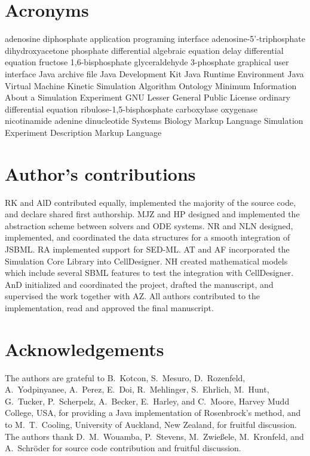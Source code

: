\documentclass[10pt]{bmc_article}
\newenvironment{bmcformat}{\begin{raggedright}\baselineskip20pt\sloppy\setboolean{publ}{false}}{\end{raggedright}\baselineskip20pt\sloppy}
\begin{document}
\begin{bmcformat}
\section*{Acronyms}
\begin{acronym}
         {adenosine diphosphate}
         {application programing interface}
         {adenosine-5'-triphosphate}
        {dihydroxyacetone phosphate}
         {differential algebraic equation}
         {delay differential equation}
      {fructose 1,6-bisphosphate}
        {glyceraldehyde 3-phosphate}
         {graphical user interface}
         {Java archive file}
         {Java Development Kit}
         {Java Runtime Environment}
         {Java Virtual Machine}
       {Kinetic Simulation Algorithm Ontology}
       {Minimum Information About a Simulation Experiment}
        {GNU Lesser General Public License}
         {ordinary differential equation}
     {ribulose-1,5-bisphosphate carboxylase oxygenase}
     {nicotinamide adenine dinucleotide}
        {Systems Biology Markup Language}
      {Simulation Experiment Description Markup Language}
\end{acronym}


\section*{Author's contributions}
RK and AlD contributed equally, implemented the majority of the source code, and
declare shared first authorship.
MJZ and HP designed and implemented the abstraction scheme between solvers and
\acs{ODE} systems.
NR and NLN designed, implemented, and coordinated the data structures for a
smooth integration of JSBML.
RA implemented support for \acs{SED-ML}.
AT and AF incorporated the Simulation Core Library into CellDesigner.
NH created mathematical models which include several SBML features to
test the integration with CellDesigner.
AnD initialized and coordinated the project, drafted the manuscript, and
supervised the work together with AZ.
All authors contributed to the implementation, read and approved the final
manuscript.    

\section*{Acknowledgements}
The authors are grateful to B.~Kotcon, S.~Mesuro, D.~Rozenfeld, A.~Yodpinyanee,
A.~Perez, E.~Doi, R.~Mehlinger, S.~Ehrlich, M.~Hunt, G.~Tucker, P.~Scherpelz,
A.~Becker, E.~Harley, and C.~Moore, Harvey Mudd College, USA, for providing a
Java implementation of Rosenbrock's method, and to M.~T.~Cooling,
University of Auckland, New Zealand, for fruitful discussion. The authors thank
D.~M.~Wouamba, P.~Stevens, M.~Zwie\ss{}ele, M.~Kronfeld, and A.~Schr\"oder for
source code contribution and fruitful discussion.


\end{bmcformat}
\end{document}
